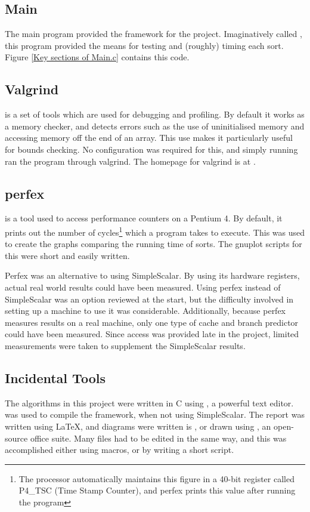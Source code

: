 \subsection{Main}
\label{Main}

The main program provided the framework for the project. Imaginatively called
, this program provided the means for testing and (roughly)
timing each sort. Figure \vref{Key sections of Main.c} contains this code.


\subsection{Valgrind}
\label{Valgrind}
 is a set of tools which are used for debugging and profiling.  By
default it works as a memory checker, and detects errors such as the use of
uninitialised memory and accessing memory off the end of an array. This use
makes it particularly useful for bounds checking. No configuration was required
for this, and simply running  ran the program through
valgrind. The homepage for valgrind is at .

\subsection{perfex}
 is a tool used to access performance counters on a Pentium 4. By default,
it prints out the number of cycles\footnote{The processor automatically
maintains this figure in a 40-bit register called P4\_TSC (Time Stamp Counter),
and perfex prints this value after running the program} which a program takes to
execute. This was used to create the graphs comparing the running time of sorts.
The gnuplot scripts for this were short and easily written.

Perfex was an alternative to using SimpleScalar. By using its hardware
registers, actual real world results could have been measured. Using perfex
instead of SimpleScalar was an option reviewed at the start, but the difficulty
involved in setting up a machine to use it was considerable. Additionally,
because perfex measures results on a real machine, only one type of cache and
branch predictor could have been measured. Since access was
provided late in the project, limited measurements were taken to supplement the
SimpleScalar results.

\subsection{Incidental Tools}
The algorithms in this project were written in C using , a powerful text
editor.  was used to compile the framework, when not using SimpleScalar.
The report was written using \LaTeX, and diagrams were written is
, or drawn using , an open-source office
suite. Many files had to be edited in the same way, and this was accomplished
either using  macros, or by writing a short  script.

